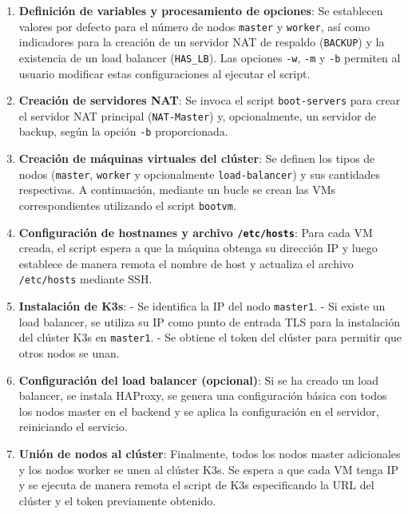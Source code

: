 \begin{enumerate}
    \item \textbf{Definición de variables y procesamiento de opciones}:  
    Se establecen valores por defecto para el número de nodos \texttt{master} y \texttt{worker}, así como indicadores para la creación de un servidor NAT de respaldo (\texttt{BACKUP}) y la existencia de un load balancer (\texttt{HAS\_LB}). Las opciones \texttt{-w}, \texttt{-m} y \texttt{-b} permiten al usuario modificar estas configuraciones al ejecutar el script.

    \item \textbf{Creación de servidores NAT}:  
    Se invoca el script \texttt{boot-servers} para crear el servidor NAT principal (\texttt{NAT-Master}) y, opcionalmente, un servidor de backup, según la opción \texttt{-b} proporcionada.

    \item \textbf{Creación de máquinas virtuales del clúster}:  
    Se definen los tipos de nodos (\texttt{master}, \texttt{worker} y opcionalmente \texttt{load-balancer}) y sus cantidades respectivas. A continuación, mediante un bucle se crean las VMs correspondientes utilizando el script \texttt{bootvm}.

    \item \textbf{Configuración de hostnames y archivo \texttt{/etc/hosts}}:  
    Para cada VM creada, el script espera a que la máquina obtenga su dirección IP y luego establece de manera remota el nombre de host y actualiza el archivo \texttt{/etc/hosts} mediante SSH.

    \item \textbf{Instalación de K3s}:  
    - Se identifica la IP del nodo \texttt{master1}.  
    - Si existe un load balancer, se utiliza su IP como punto de entrada TLS para la instalación del clúster K3s en \texttt{master1}.  
    - Se obtiene el token del clúster para permitir que otros nodos se unan.

    \item \textbf{Configuración del load balancer (opcional)}:  
    Si se ha creado un load balancer, se instala HAProxy, se genera una configuración básica con todos los nodos master en el backend y se aplica la configuración en el servidor, reiniciando el servicio.

    \item \textbf{Unión de nodos al clúster}:  
    Finalmente, todos los nodos master adicionales y los nodos worker se unen al clúster K3s. Se espera a que cada VM tenga IP y se ejecuta de manera remota el script de K3s especificando la URL del clúster y el token previamente obtenido.

\end{enumerate}


